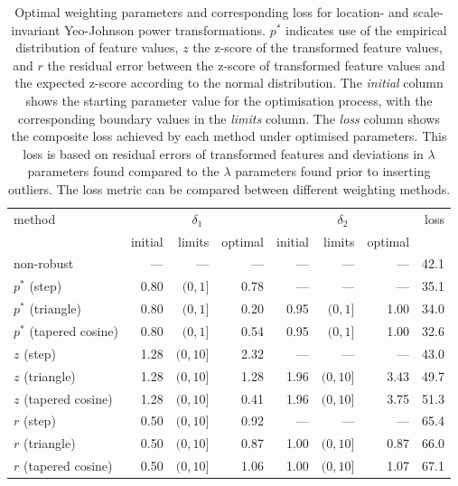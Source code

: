 \documentclass[
  a4paper,
]{article}
\begin{document}
\begin{table}
\begin{center}
\caption{Optimal weighting parameters and corresponding loss for location- and scale-invariant Yeo-Johnson power transformations.
$p^{*}$ indicates use of the empirical distribution of feature values, $z$ the z-score of the transformed feature values,
and $r$ the residual error between the z-score of transformed feature values and the expected z-score according to the normal distribution. 
The \textit{initial} column shows the starting parameter value for the optimisation process, with the corresponding boundary values in the \textit{limits} column.
The \textit{loss} column shows the composite loss achieved by each method under optimised parameters.
This loss is based on residual errors of transformed features and deviations in $\lambda$ parameters
found compared to the $\lambda$ parameters found prior to inserting outliers.
The loss metric can be compared between different weighting methods.
}
\label{tab:optimal-weighting-parameters-yeo-johnson}
\begin{tabular}{l r r r r r r r}

\toprule
method & \multicolumn{3}{c}{$\delta_1$} & \multicolumn{3}{c}{$\delta_2$} & loss \\
& initial & limits & optimal & initial & limits & optimal & \\

\midrule
non-robust               & ---  & ---       & ---  & ---  & ---       & ---  & 42.1 \\
$p^{*}$ (step)           & 0.80 & $(0, 1]$  & 0.78 & ---  & ---       & ---  & 35.1 \\
$p^{*}$ (triangle)       & 0.80 & $(0, 1]$  & 0.20 & 0.95 & $(0, 1]$  & 1.00 & 34.0 \\
$p^{*}$ (tapered cosine) & 0.80 & $(0, 1]$  & 0.54 & 0.95 & $(0, 1]$  & 1.00 & 32.6 \\
$z$ (step)               & 1.28 & $(0, 10]$ & 2.32 & ---  & ---       & ---  & 43.0 \\
$z$ (triangle)           & 1.28 & $(0, 10]$ & 1.28 & 1.96 & $(0, 10]$ & 3.43 & 49.7 \\
$z$ (tapered cosine)     & 1.28 & $(0, 10]$ & 0.41 & 1.96 & $(0, 10]$ & 3.75 & 51.3 \\
$r$ (step)               & 0.50 & $(0, 10]$ & 0.92 & ---  & ---       & ---  & 65.4 \\
$r$ (triangle)           & 0.50 & $(0, 10]$ & 0.87 & 1.00 & $(0, 10]$ & 0.87 & 66.0 \\
$r$ (tapered cosine)     & 0.50 & $(0, 10]$ & 1.06 & 1.00 & $(0, 10]$ & 1.07 & 67.1 \\
\bottomrule
\end{tabular}
\end{center}
\end{table}
\end{document}
